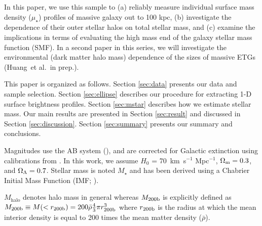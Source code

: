 \documentclass[a4paper,fleqn,usenatbib]{mnras}
\def\etal{{\ et al.~}}
\def\mstar{{$M_{\star}$}}
\def\mden{{$\mu_{\star}$}}
\begin{document}
    In this paper, we use this sample to 
    (a) reliably measure individual surface mass density (\mden{}) profiles of 
    massive galaxy out to 100 kpc, 
    (b) investigate the dependence of their outer stellar halos on total stellar 
    mass, and 
    (c) examine the implications in terms of  evaluating the high mass end of the galaxy stellar mass function (SMF). In a second paper in this series, we will investigate the environmental (dark matter halo mass) dependence of the sizes of massive ETGs (Huang\etal in prep.).
    
    This paper is organized as follows. 
    Section \ref{sec:data} presents our data and sample selection. 
    Section \ref{sec:ellipse} describes our procedure for extracting 1-D surface 
    brightness profiles. 
    Section \ref{sec:mstar} describes how we estimate stellar mass. 
    Our main results are presented in Section \ref{sec:result} and discussed in 
    Section \ref{sec:discussion}. 
    Section \ref{sec:summary} presents our summary and conclusions.

    Magnitudes use the AB system (\citealt{Oke1983}), and are corrected for Galactic 
    extinction using calibrations from \citet{Schlafly11}.
    In this work, we assume $H_0$ = 70~km~s$^{-1}$ Mpc$^{-1}$, ${\Omega}_{\rm m}=0.3$, 
    and ${\Omega}_{\rm \Lambda}=0.7$.
    Stellar mass is noted \mstar{} and has been derived using a Chabrier Initial Mass 
    Function (IMF; \citealt{Chabrier2003}).   
      
    $M_{\mathrm{halo}}$ denotes halo mass in general whereas $M_{\rm 200b}$ is 
    explicitly defined as $M_{\rm 200b}\equiv M(<r_{\rm 200b})=200\bar{\rho} 
    \frac{4}{3}\pi r_{\rm 200b}^3$ where $r_{\rm 200b}$
    is the radius at which the mean interior density is equal to 200 times
    the mean matter density ($\bar{\rho}$). 
    
\end{document}
